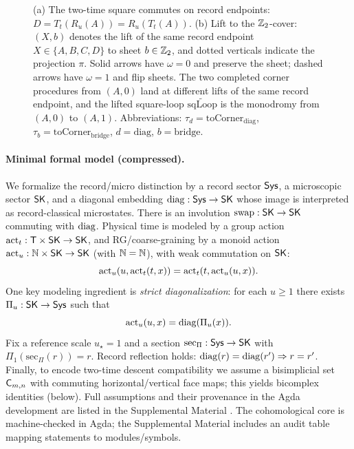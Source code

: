 \documentclass[aps,prl,reprint,floatfix]{revtex4-2}
\theoremstyle{plain}
\theoremstyle{definition}
\begin{document}
\begin{figure}[t]
\begin{minipage}[t]{0.64\textwidth}
\end{minipage}
\caption{(a) The two-time square commutes on record endpoints: $D=T_t(R_u(A))=R_u(T_t(A))$. (b) Lift to the $\mathbb{Z}_2$-cover: $(X,b)$ denotes the lift of the same record endpoint $X\in\{A,B,C,D\}$ to sheet $b\in\mathbb{Z}_2$, and dotted verticals indicate the projection $\pi$. Solid arrows have $\omega=0$ and preserve the sheet; dashed arrows have $\omega=1$ and flip sheets. The two completed corner procedures from $(A,0)$ land at different lifts of the same record endpoint, and the lifted square-loop $\widetilde{\mathrm{sqLoop}}$ is the monodromy from $(A,0)$ to $(A,1)$. Abbreviations: $\tau_d=\mathrm{toCorner}_{\mathrm{diag}}$, $\tau_b=\mathrm{toCorner}_{\mathrm{bridge}}$, $d=\mathrm{diag}$, $b=\mathrm{bridge}$.}
\label{fig:two-time-square}
\end{figure}


\paragraph{Minimal formal model (compressed).}
We formalize the record/micro distinction by a record sector $\mathsf{Sys}$, a microscopic sector $\mathsf{SK}$,
and a diagonal embedding $\operatorname{diag}:\mathsf{Sys}\to\mathsf{SK}$ whose image is interpreted as record-classical microstates.
There is an involution $\operatorname{swap}:\mathsf{SK}\to\mathsf{SK}$ commuting with $\operatorname{diag}$.
Physical time is modeled by a group action $\operatorname{act}_t:\mathsf{T}\times\mathsf{SK}\to\mathsf{SK}$,
and RG/coarse-graining by a monoid action $\operatorname{act}_u:\mathbb{N}\times\mathsf{SK}\to\mathsf{SK}$ (with $\mathbb{N}=\mathbb{N}$),
with weak commutation on $\mathsf{SK}$:
\begin{equation}
\operatorname{act}_u(u,\operatorname{act}_t(t,x))=\operatorname{act}_t(t,\operatorname{act}_u(u,x)).
\label{eq:weak-comm}
\end{equation}
One key modeling ingredient is \emph{strict diagonalization}: for each $u\ge 1$ there exists
$\Pi_u:\mathsf{SK}\to\mathsf{Sys}$ such that
\begin{equation}
\operatorname{act}_u(u,x)=\operatorname{diag}(\Pi_u(x)).
\label{eq:diag}
\end{equation}
Fix a reference scale $u_\star=1$ and a section $\mathrm{sec}_\Pi:\mathsf{Sys}\to\mathsf{SK}$ with $\Pi_1(\mathrm{sec}_\Pi(r))=r$.
Record reflection holds: $\operatorname{diag}(r)=\operatorname{diag}(r')\Rightarrow r=r'$.
Finally, to encode two-time descent compatibility we assume a bisimplicial set $\mathsf{C}_{m,n}$
with commuting horizontal/vertical face maps; this yields bicomplex identities (below).
Full assumptions and their provenance in the Agda development are listed in the Supplemental Material \cite{SM}.
The cohomological core is machine-checked in Agda; the Supplemental Material includes an audit table mapping statements to modules/symbols.
\end{document}
